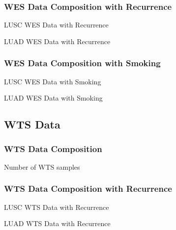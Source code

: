 \documentclass{beamer}
\begin{document}
    \begin{frame}[allowframebreaks]
        \frametitle{WES Data Composition with Recurrence}

        \begin{table}
            \caption{LUSC WES Data with Recurrence}
            \resizebox{!}{0.3 \textheight}
            {}
        \end{table}

        \begin{table}
            \caption{LUAD WES Data with Recurrence}
            
        \end{table}
    \end{frame}

    \begin{frame}[allowframebreaks]
        \frametitle{WES Data Composition with Smoking}

        \begin{table}
            \caption{LUSC WES Data with Smoking}
            \resizebox{!}{0.3 \textheight}
            {}
        \end{table}

        \begin{table}
            \caption{LUAD WES Data with Smoking}
            \resizebox{!}{0.3 \textheight}
            {}
        \end{table}
    \end{frame}

    \subsection{WTS Data}
    \begin{frame}
        \frametitle{WTS Data Composition}

        \begin{table}
            \caption{Number of WTS samples}
            
        \end{table}
    \end{frame}

    \begin{frame}[allowframebreaks]
        \frametitle{WTS Data Composition with Recurrence}

        \begin{table}
            \caption{LUSC WTS Data with Recurrence}
            
        \end{table}

        \begin{table}
            \caption{LUAD WTS Data with Recurrence}
            
        \end{table}
    \end{frame}
\end{document}
